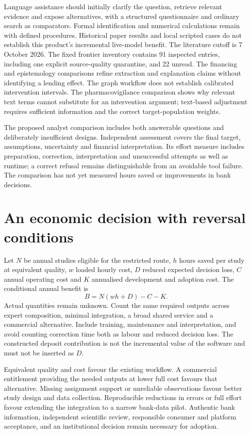 Language assistance should initially clarify the question, retrieve relevant
evidence and expose alternatives, with a structured questionnaire and ordinary
search as comparators. Formal identification and numerical calculations remain
with defined procedures. Historical paper results and local scripted cases
do not establish this product's incremental live-model benefit. The literature
cutoff is 7 October 2026. The fixed frontier inventory contains 91 inspected
entries, including one explicit source-quality quarantine, and 22 unread.
The financing and epistemology comparisons refine extraction and explanation
claims without identifying a lending effect. The graph workflow does not
establish calibrated intervention intervals. The pharmacovigilance comparison
shows why relevant text terms cannot substitute for an intervention argument;
text-based adjustment requires sufficient information and the correct
target-population weights.

The proposed analyst comparison includes both answerable questions and
deliberately insufficient designs. Independent assessment covers the final
target, assumptions, uncertainty and financial interpretation. Its effort
measure includes preparation, correction, interpretation and unsuccessful
attempts as well as runtime; a correct refusal remains distinguishable from
an avoidable tool failure. The comparison has not yet measured hours saved
or improvements in bank decisions.

\section*{An economic decision with reversal conditions}
Let $N$ be annual studies eligible for the restricted route, $h$ hours saved
per study at equivalent quality, $w$ loaded hourly cost, $D$ reduced expected
decision loss, $C$ annual operating cost and $K$ annualised development and
adoption cost. The conditional annual benefit is
\[ B=N(wh+D)-C-K. \]
Actual quantities remain unknown. Count the same required outputs across
expert composition, minimal integration, a broad shared service and a
commercial alternative. Include training, maintenance and interpretation,
and avoid counting correction time both as labour and reduced decision loss.
The constructed deposit contribution is not the incremental value of the
software and must not be inserted as $D$.

Equivalent quality and cost favour the existing workflow. A commercial
entitlement providing the needed outputs at lower full cost favours that
alternative. Missing assignment support or unreliable observations favour
better study design and data collection. Reproducible reductions in errors
or full effort favour extending the integration to a narrow bank-data
pilot. Authentic bank information, independent scientific review, responsible
consumer and platform acceptance, and an institutional decision remain
necessary for adoption.

